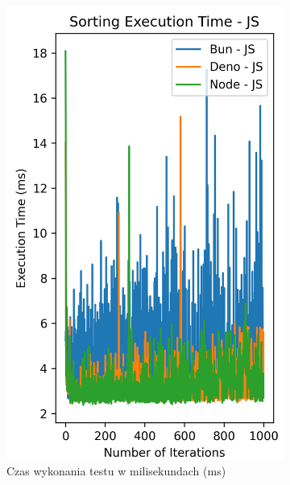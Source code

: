 \begin{figure}[H]
  \centering
  \begin{subfigure}[b]{0.42\textwidth}
    \centering
    \includegraphics[width=\textwidth]{Figures/sorting/sorting_quick_1000_10000_js_time.png}
    \caption{Czas wykonania testu w milisekundach (ms)}
    \label{fig:quick_sorting_e4_time}
  \end{subfigure}
  \begin{subfigure}[b]{0.42\textwidth}
    \centering

\end{subfigure}
\end{figure}
